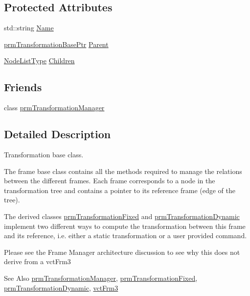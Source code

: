 \subsection*{Protected Attributes}
\begin{DoxyCompactItemize}
\item 
std\-::string \hyperlink{classprm_transformation_base_a4f96f394eb3f9d40077d8bc5825de87d}{Name}
\item 
\hyperlink{prm_transformation_base_8h_a881a6a7d2191474974cdf36d79e1df08}{prm\-Transformation\-Base\-Ptr} \hyperlink{classprm_transformation_base_a628228ce0f8caa0e5d7a46a61d3b548d}{Parent}
\item 
\hyperlink{classprm_transformation_base_a577eae3ee032e09a9ebb774081828d5c}{Node\-List\-Type} \hyperlink{classprm_transformation_base_affad35a2bd40ca707368739d300a7f76}{Children}
\end{DoxyCompactItemize}
\subsection*{Friends}
\begin{DoxyCompactItemize}
\item 
class \hyperlink{classprm_transformation_base_af7fc0618e84bdf8b1d22bc2635f29eea}{prm\-Transformation\-Manager}
\end{DoxyCompactItemize}


\subsection{Detailed Description}
Transformation base class. 

The frame base class contains all the methods required to manage the relations between the different frames. Each frame corresponds to a node in the transformation tree and contains a pointer to its reference frame (edge of the tree).

The derived classes \hyperlink{classprm_transformation_fixed}{prm\-Transformation\-Fixed} and \hyperlink{classprm_transformation_dynamic}{prm\-Transformation\-Dynamic} implement two different ways to compute the transformation between this frame and its reference, i.\-e. either a static transformation or a user provided command.

Please see the Frame Manager architecture discussion to see why this does not derive from a vct\-Frm3

\begin{DoxySeeAlso}{See Also}
\hyperlink{classprm_transformation_manager}{prm\-Transformation\-Manager}, \hyperlink{classprm_transformation_fixed}{prm\-Transformation\-Fixed}, \hyperlink{classprm_transformation_dynamic}{prm\-Transformation\-Dynamic}, \hyperlink{vct_transformation_types_8h_a81feda0a02c2d1bc26e5553f409fed20}{vct\-Frm3} 
\end{DoxySeeAlso}


